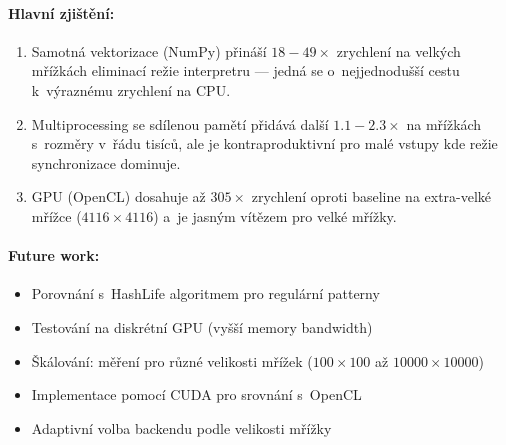 \documentclass[12pt,a4paper]{article}
\begin{document}
\paragraph{Hlavní zjištění:}
\begin{enumerate}
    \item Samotná vektorizace (NumPy) přináší $18{-}49\times$ zrychlení na velkých mřížkách eliminací režie interpretru --- jedná se o~nejjednodušší cestu k~výraznému zrychlení na CPU.
    \item Multiprocessing se sdílenou pamětí přidává další $1.1{-}2.3\times$ na mřížkách s~rozměry v~řádu tisíců, ale je kontraproduktivní pro malé vstupy kde režie synchronizace dominuje.
    \item GPU (OpenCL) dosahuje až $305\times$ zrychlení oproti baseline na extra-velké mřížce ($4116{\times}4116$) a~je jasným vítězem pro velké mřížky.
\end{enumerate}

\paragraph{Future work:}
\begin{itemize}
    \item Porovnání s~HashLife algoritmem pro regulární patterny
    \item Testování na diskrétní GPU (vyšší memory bandwidth)
    \item Škálování: měření pro různé velikosti mřížek ($100{\times}100$ až $10000{\times}10000$)
    \item Implementace pomocí CUDA pro srovnání s~OpenCL
    \item Adaptivní volba backendu podle velikosti mřížky
\end{itemize}
\end{document}
